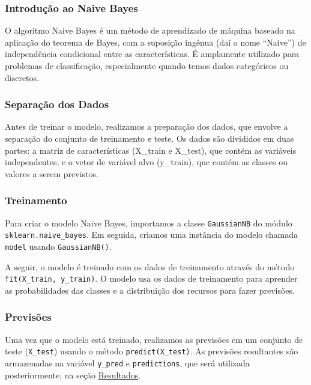 \documentclass[11pt]{article}
\begin{document}
\hypertarget{introduuxe7uxe3o-ao-naive-bayes}{%
\subsubsection{Introdução ao Naive
Bayes}\label{introduuxe7uxe3o-ao-naive-bayes}}

O algoritmo Naive Bayes é um método de aprendizado de máquina baseado na
aplicação do teorema de Bayes, com a suposição ingênua (daí o nome
``Naive'') de independência condicional entre as características. É
amplamente utilizado para problemas de classificação, especialmente
quando temos dados categóricos ou discretos.

\hypertarget{separauxe7uxe3o-dos-dados}{%
\subsubsection{Separação dos Dados}\label{separauxe7uxe3o-dos-dados}}

Antes de treinar o modelo, realizamos a preparação dos dados, que
envolve a separação do conjunto de treinamento e teste. Os dados são
divididos em duas partes: a matriz de características (X\_train e
X\_test), que contém as variáveis independentes, e o vetor de variável
alvo (y\_train), que contém as classes ou valores a serem previstos.

\hypertarget{treinamento}{%
\subsubsection{Treinamento}\label{treinamento}}

Para criar o modelo Naive Bayes, importamos a classe \texttt{GaussianNB}
do módulo \texttt{sklearn.naive\_bayes}. Em seguida, criamos uma
instância do modelo chamada \texttt{model} usando \texttt{GaussianNB()}.

A seguir, o modelo é treinado com os dados de treinamento através do
método \texttt{fit(X\_train,\ y\_train)}. O modelo usa os dados de
treinamento para aprender as probabilidades das classes e a distribuição
dos recursos para fazer previsões.

\hypertarget{previsuxf5es}{%
\subsubsection{Previsões}\label{previsuxf5es}}

Uma vez que o modelo está treinado, realizamos as previsões em um
conjunto de teste (\texttt{X\_test}) usando o método
\texttt{predict(X\_test)}. As previsões resultantes são armazenadas na
variável \texttt{y\_pred} e \texttt{predictions}, que será utilizada
posteriormente, na seção \hyperref[resultados]{Resultados}.
\end{document}
